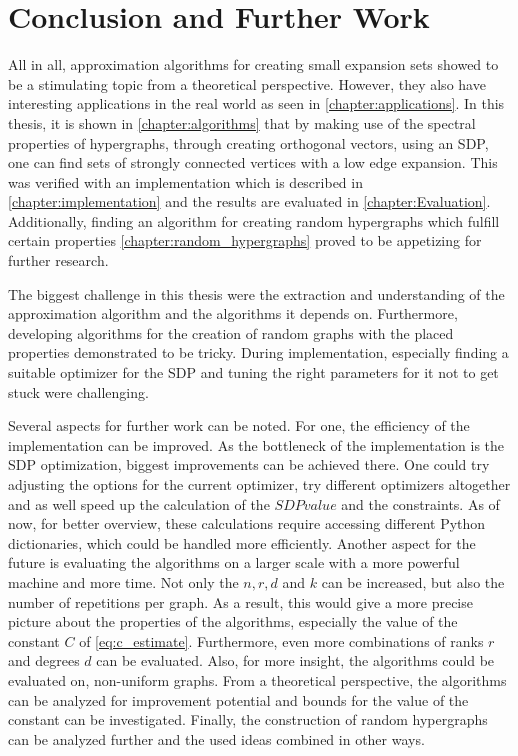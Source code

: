 \chapter{Conclusion and Further Work}\label{chapter:resmue_further_work}

All in all, approximation algorithms for creating small expansion sets showed to be a stimulating topic from a theoretical perspective. However, they also have interesting applications in the real world as seen in \cref{chapter:applications}. In this thesis, it is shown in \cref{chapter:algorithms} that by making use of the spectral properties of hypergraphs, through creating orthogonal vectors, using an SDP, one can find sets of strongly connected vertices with a low edge expansion. This was verified with an implementation which is described in \cref{chapter:implementation} and the results are evaluated in \cref{chapter:Evaluation}.
Additionally, finding an algorithm for creating random hypergraphs which fulfill certain properties \cref{chapter:random_hypergraphs} proved to be appetizing for further research.

The biggest challenge in this thesis were the extraction and understanding of the approximation algorithm and the algorithms it depends on. Furthermore, developing algorithms for the creation of random graphs with the placed properties demonstrated to be tricky. During implementation, especially finding a suitable optimizer for the SDP and tuning the right parameters for it not to get stuck were challenging.

Several aspects for further work can be noted. 
For one, the efficiency of the implementation can be improved. As the bottleneck of the implementation is the SDP optimization, biggest improvements can be achieved there. One could try adjusting the options for the current optimizer, try different optimizers altogether and as well speed up the calculation of the $SDPvalue$ and the constraints. As of now, for better overview, these calculations require accessing different Python dictionaries, which could be handled more efficiently.
Another aspect for the future is evaluating the algorithms on a larger scale with a more powerful machine and more time. Not only the $n, r, d$ and $k$ can be increased, but also the number of repetitions per graph. As a result, this would give a more precise picture about the properties of the algorithms, especially the value of the constant $C$ of \cref{eq:c_estimate}. Furthermore, even more combinations of ranks $r$ and degrees $d$ can be evaluated. Also, for more insight, the algorithms could be evaluated on, non-uniform graphs. 
From a theoretical perspective, the algorithms can be analyzed for improvement potential and bounds for the value of the constant can be investigated. Finally, the construction of random hypergraphs can be analyzed further and the used ideas combined in other ways.

